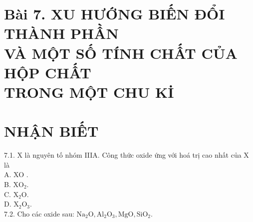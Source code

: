 \documentclass[10pt]{article}
\begin{document}
\section*{Bài 7. XU HƯỚNG BIẾN ĐỔI THÀNH PHẦN \\
 VÀ MỘT SỐ TÍNH CHẤT CỦA HỘP CHẤT \\
 TRONG MỘT CHU Kİ }
\section*{NHẬN BIẾT}
7.1. X là nguyên tố nhóm IIIA. Công thức oxide ứng với hoá trị cao nhất của X là\\
A. XO .\\
B. $\mathrm{XO}_{2}$.\\
C. $\mathrm{X}_{2} \mathrm{O}$.\\
D. $\mathrm{X}_{2} \mathrm{O}_{3}$.\\
7.2. Cho các oxide sau: $\mathrm{Na}_{2} \mathrm{O}, \mathrm{Al}_{2} \mathrm{O}_{3}, \mathrm{MgO}, \mathrm{SiO}_{2}$.
\end{document}
